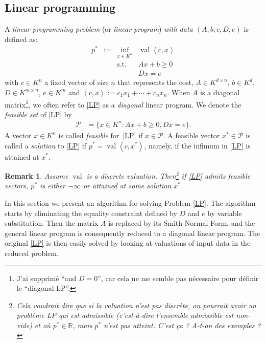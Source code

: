 \documentclass[a4paper,oneside,11pt]{article}
\newtheorem{remark}[theorem]{Remark}
\newcommand{\R}{\mathbb{R}} %
\newcommand{\PP}{\mathcal{P}}
\newcommand{\simone}[1]{{\color{blue} #1}} %
\DeclareMathOperator{\val}{val}
\begin{document}




\subsection{Linear programming}

A \emph{linear programming problem} (or \emph{linear program}) \emph{with data $(A,b,c,D,e)$} is defined
as:
\begin{equation}
  \tag{LP}\label{LP}
\begin{array}{rcll}
  p^* & := & \inf_{x \in K^n} & \val \left\langle c, x \right\rangle \\
  &    & \text{s.t.}         & A x + b \geq 0\\
  & & & D x = e
\end{array}
\end{equation}
with $c \in K^n$ a fixed vector of size $n$ that represents the cost,
$A \in K^{d \times n}$, $b \in K^d$, $D \in K^{m\times n}$, $e \in K^m$ 
and $\left\langle c, x \right\rangle := c_1 x_1+\cdots +c_n x_n$.
When $A$ is a diagonal matrix\footnote{\simone{J'ai supprimé ``and
$D=0$'', car cela ne me semble pas nécessaire pour définir le ``diagonal LP''.}},
we often refer to \eqref{LP} as a \emph{diagonal} linear program.
We denote the \emph{feasible set} of \eqref{LP} by
\begin{equation*}
\begin{aligned}
  \PP  &= \{x \in K^n : Ax + b \geq 0, Dx = e\}.
\end{aligned}
\end{equation*}
A vector $x \in K^n$ is called \emph{feasible} for~\eqref{LP} if $x \in \PP$. A feasible vector $x^* \in \PP$ is called a \emph{solution} to \eqref{LP} if $p^* = \val\left\langle c,x^*\right\rangle$, namely, if the infimum in \eqref{LP} is attained at $x^*$.

\begin{remark}
  Assume $\val$ is a discrete valuation. Then\footnote{\simone{Cela voudrait dire que
    si la valuation n'est pas discrète, on pourrait avoir un problème LP qui est admissible
    (c'est-à-dire l'ensemble admissible est non-vide) et où $p^* \in \R$, mais $p^*$ n'est
  pas atteint. C'est ça ? A-t-on des exemples ?}} if \eqref{LP} admits feasible vectors,
  $p^*$ is either $-\infty$ or attained at some solution $x^*$.
\end{remark}

In this section we present an algorithm for solving Problem \eqref{LP}.
The algorithm starts by eliminating the equality constraint defined by $D$ and $e$
by variable substitution. Then the matrix $A$ is replaced by its Smith Normal Form,
and the general linear program is consequently reduced to a diagonal linear program.
The original \eqref{LP} is then easily solved by looking at valuations of input data
in the reduced problem.
\end{document}
